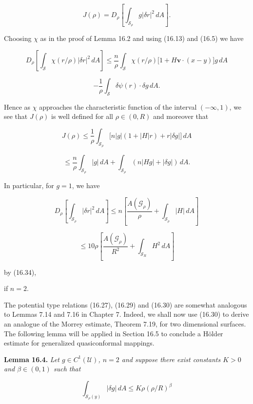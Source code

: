 \[
J(\rho)=D_\rho\left[\int_{\mathcal{S}_\rho} g|\delta r|^2\,dA\right].
\]

Choosing $\chi$ as in the proof of Lemma 16.2 and using (16.13) and (16.5) we have

\[
D_{\rho}\left[\int_{\mathcal S}\chi(r/\rho)|\delta r|^{2}\,dA\right]
\le \frac{n}{\rho}\int_{\mathcal S}\chi(r/\rho)\bigl[1+H\mathbf v\cdot(x-y)\bigr]g\,dA
\]

\[
-\frac{1}{\rho}\int_{\mathcal S}\delta\psi(r)\cdot\delta g\,dA.
\]

Hence as $\chi$ approaches the characteristic function of the interval $(-\infty,1)$, we see that $J(\rho)$ is well defined for all $\rho\in (0,R)$ and moreover that

\begin{equation}
J(\rho)\le \frac{1}{\rho}\int_{\mathcal S_{\rho}}\bigl[n|g|(1+|H|r)+r|\delta g|\bigr]\,dA
\tag{16.35}
\end{equation}

\[
\le \frac{n}{\rho}\int_{\mathcal S_{\rho}}|g|\,dA+\int_{\mathcal S_{\rho}}(n|Hg|+|\delta g|)\,dA.
\]

In particular, for $g=1$, we have

\[
D_{\rho}\left[\int_{\mathcal S_{\rho}}|\delta r|^{2}\,dA\right]
\le n\left[\frac{A(\mathcal G_{\rho})}{\rho}+\int_{\mathcal S_{\rho}}|H|\,dA\right]
\]

\begin{equation}
\le 10\rho\left[\frac{A(\mathcal G_{\rho})}{R^{2}}+\int_{\mathcal S_{R}}H^{2}\,dA\right]
\tag{16.36}
\end{equation}

by (16.34),

if $n=2$.

The potential type relations (16.27), (16.29) and (16.30) are somewhat analogous to Lemmas 7.14 and 7.16 in Chapter 7. Indeed, we shall now use (16.30) to derive an analogue of the Morrey estimate, Theorem 7.19, for two dimensional surfaces. The following lemma will be applied in Section 16.5 to conclude a Hölder estimate for generalized quasiconformal mappings.

\textbf{Lemma 16.4.} \emph{Let $g\in C^{1}(\mathcal U)$, $n=2$ and suppose there exist constants $K>0$ and $\beta\in(0,1)$ such that}

\begin{equation}
\int_{\mathcal S_{\rho}(y)}|\delta g|\,dA\le K\rho(\rho/R)^{\beta}
\tag{16.37}
\end{equation}

